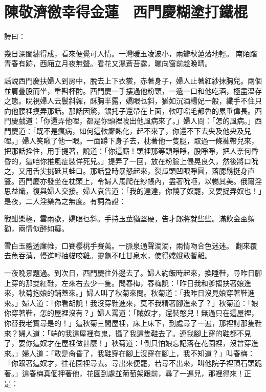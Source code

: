 %

\chapter{陳敬濟徼幸得金蓮　西門慶糊塗打鐵棍}

詩曰：

幾日深閨繡得成，看來便覺可人情。一灣暖玉凌波小，兩瓣秋蓮落地輕。
南陌踏青春有跡，西廂立月夜無聲。看花又濕蒼苔露，曬向窗前趁晚晴。

話說西門慶扶婦人到房中，脫去上下衣裳，赤著身子，婦人止著紅紗抹胸兒。兩個並肩疊股而坐，重斟杯酌。西門慶一手摟過他粉頸，一遞一口和他吃酒，極盡溫存之態。睨視婦人云鬟斜嚲，酥胸半露，嬌眼乜斜，猶如沉酒楊妃一般，纖手不住只向他腰裡摸弄那話。那話因驚，銀托子還帶在上面，軟叮噹毛都魯的累垂偉長。西門慶戲道：「你還弄他哩，都是你頭裡唬出他風病來了。」婦人問：「怎的風病。」西門慶道：「既不是瘋病，如何這軟癱熱化，起不來了，你還不下去央及他央及兒哩。」婦人笑瞅了他一眼。一面蹲下身子去，枕著他一隻腿，取過一條褲帶兒來，把那話拴住，用手提著，說道：「你這廝！頭裡那等頭睜睜，股睜睜，把人奈何昏昏的，這咱你推風症裝佯死兒。」提弄了一回，放在粉臉上偎晃良久，然後將口吮之，又用舌尖挑砥其蛙口。那話登時暴怒起來，裂瓜頭凹眼睜圓，落腮鬍挺身直豎。西門慶亦發坐在枕頭上，令婦人馬爬在紗帳內，盡著吮咂，以暢其美。俄爾淫思益熾，復與婦人交接。婦人哀告道：「我的達達，你饒了奴罷，又要捉弄奴也！」是夜，二人淫樂為之無度。有詞為證：

戰酣樂極，雲雨歇，嬌眼乜斜。手持玉莖猶堅硬，告才郎將就些些。滿飲金盃頻勸，兩情似醉如癡。

雪白玉體透廉帷，口賽櫻桃手賽荑。一脈泉通聲滴滴，兩情吻合色迷迷。
翻來覆去魚吞藻，慢進輕抽貓咬雞。靈龜不吐甘泉水，使得嫦娥敢暫離。

一夜晚景題過。到次日，西門慶往外邊去了。婦人約飯時起來，換睡鞋，尋昨日腳上穿的那雙紅鞋，左來右去少一隻。問春梅，春梅說：「昨日我和爹搊扶著娘進來，秋菊抱娘的鋪蓋來。」婦人叫了秋菊來問。秋菊道：「我昨日沒見娘穿著鞋進來。」婦人道：「你看胡說！我沒穿鞋進來，莫不我精著腳進來了？」秋菊道：「娘你穿著鞋，怎的屋裡沒有？」婦人罵道：「賊奴才，還裝憨兒！無過只在這屋裡，你替我老實尋是的！」這秋菊三間屋裡，床上床下，到處尋了一遍，那裡討那隻鞋來？婦人道：「端的我這屋裡有鬼，攝了我這隻鞋去了。連我腳上穿的鞋都不見了，要你這奴才在屋裡做甚麼！」秋菊道：「倒只怕娘忘記落在花園裡，沒曾穿進來。」婦人道：「敢是肏昏了，我鞋穿在腳上沒穿在腳上，我不知道？」叫春梅：「你跟著這奴才，往花園裡尋去。尋出來便罷，若尋不出來，叫他院子裡頂石頭跪著。」這春梅真個押著他，花園到處並葡萄架跟前，尋了一遍兒，那裡得來！正是：

